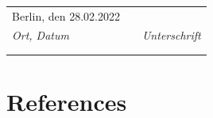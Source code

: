 \documentclass[12pt,twoside]{reedthesis}
\begin{document}
\hfill\break
~

\hfill\break
~

\hfill\break
~
\begin{tabular}{m{6cm}m{2cm}m{6cm}}
Berlin, den 28.02.2022 &  &              \\ \cline{1-1} \cline{3-3} 
\textit{Ort, Datum}            &  & \textit{Unterschrift} \\
                       &  &              \\
                       &  &             
\end{tabular}
\backmatter

\hypertarget{references}{%
\chapter*{References}\label{references}}


\noindent

\setlength{\parindent}{-0.20in}
\end{document}
